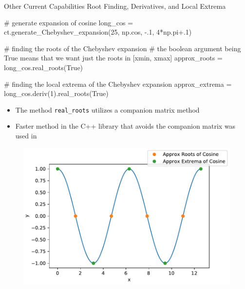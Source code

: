 \documentclass[final]{beamer}
\begin{document}
\begin{frame}[fragile]{}
\begin{columns}[t]
  \begin{column}{.31\linewidth}
\begin{block}{Other Current Capabilities}
{\color{numhypRed} Root Finding, Derivatives, and Local Extrema}\\

\begin{python}
# generate expansion of cosine
long_cos = ct.generate_Chebyshev_expansion(25, np.cos, -.1, 4*np.pi+.1)

# finding the roots of the Chebyshev expansion
# the boolean argument being True means that we want just the roots in [xmin, xmax]
approx_roots = long_cos.real_roots(True)

# finding the local extrema of the Chebyshev expansion
approx_extrema = long_cos.deriv(1).real_roots(True)
\end{python}

	\begin{minipage}{.4\linewidth}
		\begin{itemize}
		\item The method {\tt real\_roots} utilizes a companion matrix method \cite{boyd_2013}
		\item Faster method in the C++ library that avoids the companion matrix was used in \cite{bell_2018-2}
		\end{itemize}
	\end{minipage}%
	\hfill%
	\begin{minipage}{.55\linewidth}
	\begin{figure}
	\includegraphics[width = \textwidth]{cos_roots.pdf}
	\end{figure}
	\end{minipage}%
\end{block}




\end{column}
\end{columns}
\end{frame}
\end{document}
